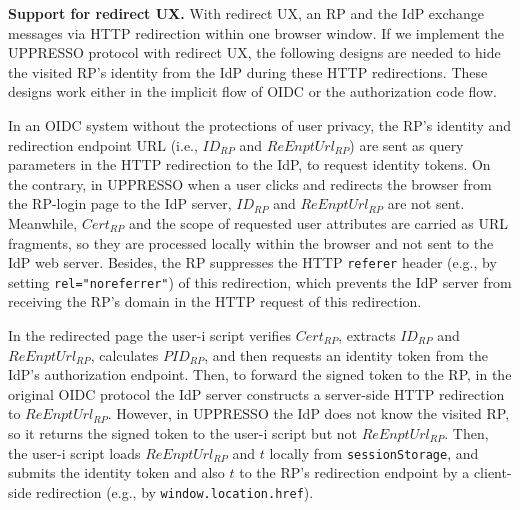 \noindent \textbf{Support for redirect UX.}
With redirect UX, 
    an RP and the IdP exchange messages via HTTP redirection within one browser window.
If we implement the UPPRESSO protocol with redirect UX,
the following designs are needed to hide the visited RP's identity from the IdP %
during these HTTP redirections.
These designs work either in the implicit flow of OIDC or the authorization code flow.

In an OIDC system without the protections of user privacy,
the RP's identity and redirection endpoint URL (i.e., $ID_{RP}$ and $ReEnptUrl_{RP}$) are sent as query parameters in the HTTP redirection to the IdP, 
    to request identity tokens.
On the contrary, in UPPRESSO
 when a user clicks and redirects the browser from the RP-login page to the IdP server,
    $ID_{RP}$ and $ReEnptUrl_{RP}$ are not sent.
Meanwhile,
    $Cert_{RP}$ and the scope of requested user attributes are carried as URL fragments,
so they are processed locally within the browser and not sent to the IdP web server.
Besides, the RP suppresses the HTTP \texttt{referer} header (e.g., by setting \verb+rel="noreferrer"+) of this redirection, which prevents the IdP server from receiving the RP's domain in the HTTP request of this redirection.

In the redirected page
the user-i script verifies $Cert_{RP}$, extracts $ID_{RP}$ and $ReEnptUrl_{RP}$,
calculates $PID_{RP}$, and then requests an identity token from the IdP's authorization endpoint.
Then, to forward the signed token to the RP,
    in the original OIDC protocol
        the IdP server constructs a server-side HTTP redirection to $ReEnptUrl_{RP}$.
However, in UPPRESSO the IdP does not know the visited RP,
    so it returns the signed token to the user-i script but not $ReEnptUrl_{RP}$.
Then, the user-i script loads $ReEnptUrl_{RP}$ and $t$ locally from \verb+sessionStorage+, and submits the identity token and also $t$ to the RP's redirection endpoint 
by a client-side redirection (e.g., by \verb+window.location.href+).

%


